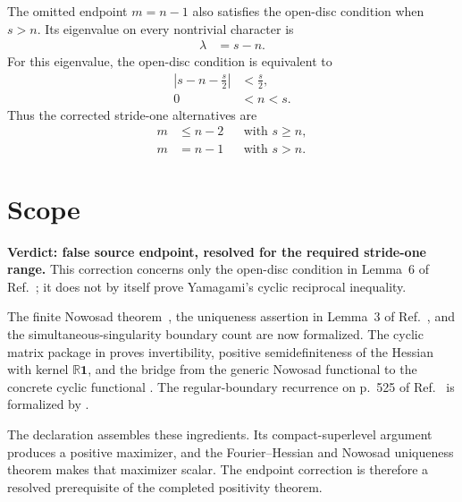 \documentclass[11pt]{article}
\begin{document}
The omitted endpoint $m=n-1$ also satisfies the open-disc condition when
$s>n$. Its eigenvalue on every nontrivial character is
\begin{align}
    \lambda
        &= s-n.
    \label{eq:yamagami93_lemma6_endpoint_shifted_endpoint_eigenvalue}
\end{align}
For this eigenvalue, the open-disc condition is equivalent to
\begin{align}
    \left|s-n-\frac{s}{2}\right|
        &< \frac{s}{2},
    \label{eq:yamagami93_lemma6_endpoint_shifted_endpoint_disk}\\
    0
        &< n<s.
    \label{eq:yamagami93_lemma6_endpoint_shifted_endpoint_condition}
\end{align}
Thus the corrected stride-one alternatives are
\begin{align}
    m
        &\leq n-2
        &&\text{with }s\geq n,
    \label{eq:yamagami93_lemma6_endpoint_corrected_main_range}\\
    m
        &= n-1
        &&\text{with }s>n.
    \label{eq:yamagami93_lemma6_endpoint_corrected_endpoint_range}
\end{align}

\section{Scope}

\textbf{Verdict: false source endpoint, resolved for the required stride-one
range.} This correction concerns only the open-disc condition in Lemma~6 of
Ref.~\cite{Yamagami1993Cyclic}; it does not by itself prove Yamagami's cyclic
reciprocal inequality.

The finite Nowosad theorem~\cite{Nowosad1968Isoperimetric}, the uniqueness
assertion in Lemma~3 of Ref.~\cite{Yamagami1993Cyclic}, and the
simultaneous-singularity boundary count are now formalized. The cyclic matrix
package in  proves
invertibility, positive semidefiniteness of the Hessian with kernel
$\mathbb R\mathbf 1$, and the bridge from the generic Nowosad functional to the
concrete cyclic functional . The regular-boundary
recurrence on p.~525 of Ref.~\cite{Yamagami1993Cyclic} is formalized by
.

The declaration  assembles these
ingredients. Its compact-superlevel argument produces a positive maximizer,
and the Fourier--Hessian and Nowosad uniqueness theorem makes that maximizer
scalar. The endpoint correction is therefore a resolved prerequisite of the
completed positivity theorem.



\end{document}
